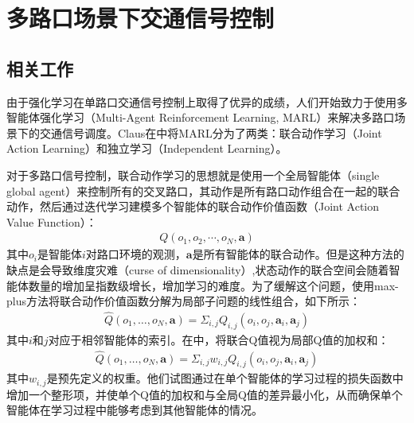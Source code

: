 
\chapter{多路口场景下交通信号控制}

\section{相关工作}
由于强化学习在单路口交通信号控制上取得了优异的成绩，人们开始致力于使用多智能体强化学习（Multi-Agent Reinforcement Learning, MARL）来解决多路口场景下的交通信号调度。Claus在中将MARL分为了两类：联合动作学习（Joint Action Learning）和独立学习（Independent Learning）。

对于多路口信号控制，联合动作学习的思想就是使用一个全局智能体（single global agent）来控制所有的交叉路口，其动作是所有路口动作组合在一起的联合动作，然后通过迭代学习建模多个智能体的联合动作价值函数（Joint Action Value Function）：
\begin{align}
  Q(o_1, o_2, \cdots, o_N, \mathbf{a})
\end{align}
其中$o_i$是智能体$i$对路口环境的观测，$\mathbf{a}$是所有智能体的联合动作。但是这种方法的缺点是会导致维度灾难（curse of dimensionality）,状态动作的联合空间会随着智能体数量的增加呈指数级增长，增加学习的难度。为了缓解这个问题，使用max-plus方法将联合动作价值函数分解为局部子问题的线性组合，如下所示：
\begin{align}
  \hat{Q}\left(o_{1}, \ldots, o_{N}, \mathbf{a}\right)=\Sigma_{i, j} Q_{i, j}\left(o_{i}, o_{j}, \mathbf{a}_{i}, \mathbf{a}_{j}\right)
\end{align}
其中$i \text{和} j$对应于相邻智能体的索引。在中，将联合Q值视为局部Q值的加权和：
\begin{align}
  \hat{Q}\left(o_{1}, \ldots, o_{N}, \mathbf{a}\right)=\Sigma_{i, j} w_{i, j} Q_{i, j}\left(o_{i}, o_{j}, \mathbf{a}_{i}, \mathbf{a}_{j}\right)
\end{align}
其中$w_{i,j}$是预先定义的权重。他们试图通过在单个智能体的学习过程的损失函数中增加一个整形项，并使单个Q值的加权和与全局Q值的差异最小化，从而确保单个智能体在学习过程中能够考虑到其他智能体的情况。

